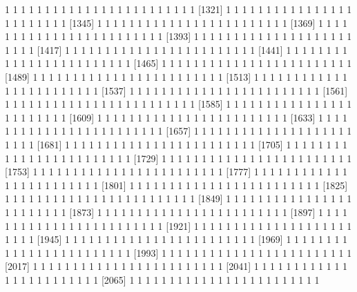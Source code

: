 \documentclass[11pt]{article}
\begin{document}
\begin{Schunk}
\begin{Soutput}
 [1297]  1  1  1  1  1  1  1  1  1  1  1  1  1  1  1  1  1  1  1  1  1  1  1  1
 [1321]  1  1  1  1  1  1  1  1  1  1  1  1  1  1  1  1  1  1  1  1  1  1  1  1
 [1345]  1  1  1  1  1  1  1  1  1  1  1  1  1  1  1  1  1  1  1  1  1  1  1  1
 [1369]  1  1  1  1  1  1  1  1  1  1  1  1  1  1  1  1  1  1  1  1  1  1  1  1
 [1393]  1  1  1  1  1  1  1  1  1  1  1  1  1  1  1  1  1  1  1  1  1  1  1  1
 [1417]  1  1  1  1  1  1  1  1  1  1  1  1  1  1  1  1  1  1  1  1  1  1  1  1
 [1441]  1  1  1  1  1  1  1  1  1  1  1  1  1  1  1  1  1  1  1  1  1  1  1  1
 [1465]  1  1  1  1  1  1  1  1  1  1  1  1  1  1  1  1  1  1  1  1  1  1  1  1
 [1489]  1  1  1  1  1  1  1  1  1  1  1  1  1  1  1  1  1  1  1  1  1  1  1  1
 [1513]  1  1  1  1  1  1  1  1  1  1  1  1  1  1  1  1  1  1  1  1  1  1  1  1
 [1537]  1  1  1  1  1  1  1  1  1  1  1  1  1  1  1  1  1  1  1  1  1  1  1  1
 [1561]  1  1  1  1  1  1  1  1  1  1  1  1  1  1  1  1  1  1  1  1  1  1  1  1
 [1585]  1  1  1  1  1  1  1  1  1  1  1  1  1  1  1  1  1  1  1  1  1  1  1  1
 [1609]  1  1  1  1  1  1  1  1  1  1  1  1  1  1  1  1  1  1  1  1  1  1  1  1
 [1633]  1  1  1  1  1  1  1  1  1  1  1  1  1  1  1  1  1  1  1  1  1  1  1  1
 [1657]  1  1  1  1  1  1  1  1  1  1  1  1  1  1  1  1  1  1  1  1  1  1  1  1
 [1681]  1  1  1  1  1  1  1  1  1  1  1  1  1  1  1  1  1  1  1  1  1  1  1  1
 [1705]  1  1  1  1  1  1  1  1  1  1  1  1  1  1  1  1  1  1  1  1  1  1  1  1
 [1729]  1  1  1  1  1  1  1  1  1  1  1  1  1  1  1  1  1  1  1  1  1  1  1  1
 [1753]  1  1  1  1  1  1  1  1  1  1  1  1  1  1  1  1  1  1  1  1  1  1  1  1
 [1777]  1  1  1  1  1  1  1  1  1  1  1  1  1  1  1  1  1  1  1  1  1  1  1  1
 [1801]  1  1  1  1  1  1  1  1  1  1  1  1  1  1  1  1  1  1  1  1  1  1  1  1
 [1825]  1  1  1  1  1  1  1  1  1  1  1  1  1  1  1  1  1  1  1  1  1  1  1  1
 [1849]  1  1  1  1  1  1  1  1  1  1  1  1  1  1  1  1  1  1  1  1  1  1  1  1
 [1873]  1  1  1  1  1  1  1  1  1  1  1  1  1  1  1  1  1  1  1  1  1  1  1  1
 [1897]  1  1  1  1  1  1  1  1  1  1  1  1  1  1  1  1  1  1  1  1  1  1  1  1
 [1921]  1  1  1  1  1  1  1  1  1  1  1  1  1  1  1  1  1  1  1  1  1  1  1  1
 [1945]  1  1  1  1  1  1  1  1  1  1  1  1  1  1  1  1  1  1  1  1  1  1  1  1
 [1969]  1  1  1  1  1  1  1  1  1  1  1  1  1  1  1  1  1  1  1  1  1  1  1  1
 [1993]  1  1  1  1  1  1  1  1  1  1  1  1  1  1  1  1  1  1  1  1  1  1  1  1
 [2017]  1  1  1  1  1  1  1  1  1  1  1  1  1  1  1  1  1  1  1  1  1  1  1  1
 [2041]  1  1  1  1  1  1  1  1  1  1  1  1  1  1  1  1  1  1  1  1  1  1  1  1
 [2065]  1  1  1  1  1  1  1  1  1  1  1  1  1  1  1  1  1  1  1  1  1  1  1  1

\end{Soutput}
\end{Schunk}
\end{document}
